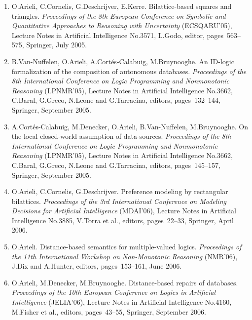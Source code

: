 \documentclass{article}
\begin{document}
\begin{enumerate}
   \item O.Arieli, C.Cornelis, G.Deschrijver, E.Kerre.
         Bilattice-based squares and triangles.  {\em Proceedings of the 8th European
         Conference on Symbolic and Quantitative Approaches to Reasoning with
         Uncertainty\/} (ECSQARU'05), Lecture Notes in Artificial Intelligence
         No.3571, L.Godo, editor, pages~563--575, Springer, July 2005.

   \item B.Van-Nuffelen, O.Arieli, A.Cort\'es-Calabuig, M.Bruynooghe.
         An ID-logic formalization of the composition of autonomous databases.
         {\em Proceedings of the 8th International Conference on Logic Programming and
         Nonmonotonic Reasoning\/} (LPNMR'05),
         Lecture Notes in Artificial Intelligence No.3662, C.Baral, G.Greco,
         N.Leone and G.Tarracina, editors, pages~132--144, Springer, September 2005.

   \item A.Cort\'es-Calabuig, M.Denecker, O.Arieli, B.Van-Nuffelen, M.Bruynooghe.
         On the local closed-world assumption of data-sources. {\em Proceedings of the 8th
         International Conference on Logic Programming and Nonmonotonic
         Reasoning\/} (LPNMR'05),
         Lecture Notes in Artificial Intelligence No.3662, C.Baral, G.Greco, N.Leone
         and G.Tarracina, editors, pages~145--157, Springer, September 2005.

   \item O.Arieli, C.Cornelis, G.Deschrijver.
         Preference modeling by rectangular bilattices. {\em Proceedings of the 3rd
         International Conference on Modeling Decisions for
         Artificial Intelligence\/} (MDAI'06),
         Lecture Notes in Artificial Intelligence No.3885, V.Torra et al.,
         editors, pages~22--33, Springer, April 2006.

   \item O.Arieli.
         Distance-based semantics for multiple-valued logics. {\em Proceedings of the 11th
         International Workshop on Non-Monotonic Reasoning \/} (NMR'06),
         J.Dix and A.Hunter, editors, pages~153--161, June 2006.

   \item O.Arieli, M.Denecker, M.Bruynooghe.
         Distance-based repairs of databases. {\em Proceedings of the 10th European Conference
         on Logics in Artificial Intelligence\/} (JELIA'06),
         Lecture Notes in Artificial Intelligence No.4160, M.Fisher et al.,
         editors, pages~43--55, Springer, September 2006.


\end{enumerate}
\end{document}

